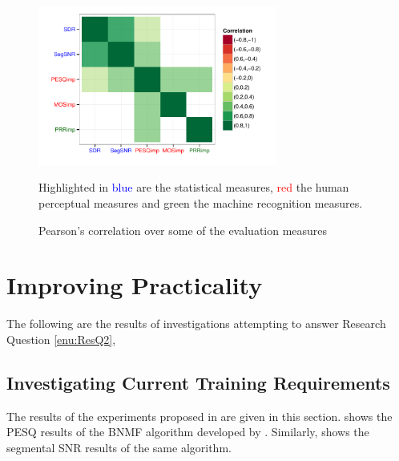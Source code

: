\begin{figure}[h]
\noindent \begin{centering}
\includegraphics[width=0.7\textwidth]{fig/R/cor/litResCorr}
\par\end{centering}

Highlighted in \textcolor{blue}{blue} are the statistical measures,
\textcolor{red}{red} the human perceptual measures and \textcolor{dkgreen}{green}
the machine recognition measures.

\protect\caption{\label{fig:litResCorr}Pearson's correlation over some of the evaluation
measures}
\end{figure}



\section{Improving Practicality}

The following are the results of investigations attempting to answer
Research Question \ref{enu:ResQ2}, \textit{\RQtwo{}}


\subsection{Investigating Current Training Requirements}

The results of the experiments proposed in 
are given in this section.  shows the
\ac{PESQ} results of the \ac{BNMF} algorithm developed by \citet{mohammadiha2013supervised}.
Similarly,  shows the segmental \ac{SNR}
results of the same algorithm.

